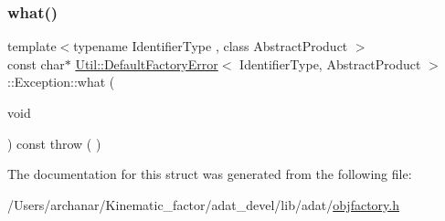 \subsubsection{\texorpdfstring{what()}{what()}\hspace{0.1cm}{\footnotesize\ttfamily [2/2]}}
{\footnotesize\ttfamily template$<$typename Identifier\+Type , class Abstract\+Product $>$ \\
const char$\ast$ \mbox{\hyperlink{structUtil_1_1DefaultFactoryError}{Util\+::\+Default\+Factory\+Error}}$<$ Identifier\+Type, Abstract\+Product $>$\+::Exception\+::what (\begin{DoxyParamCaption}\item[{void}]{ }\end{DoxyParamCaption}) const throw ( ) \hspace{0.3cm}{\ttfamily [inline]}}



The documentation for this struct was generated from the following file\+:\begin{DoxyCompactItemize}
\item 
/\+Users/archanar/\+Kinematic\+\_\+factor/adat\+\_\+devel/lib/adat/\mbox{\hyperlink{lib_2adat_2objfactory_8h}{objfactory.\+h}}\end{DoxyCompactItemize}
